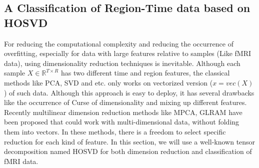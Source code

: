 \documentclass[journal]{IEEEtran}
\begin{document}
	\subsection{ A Classification of Region-Time data  based on  HOSVD}
	For reducing the computational complexity and reducing the occurrence of overfitting, especially for data with large features relative to samples (Like fMRI data), using dimensionality reduction techniques is inevitable. Although each sample $X\in \mathbb{R}^{T\times R}$ has two different time and region features, the classical methods like PCA, SVD and etc. only works on vectorized version ($x=vec(X)$) of such data.
	Although this approach is easy to deploy, it has several drawbacks like the occurrence of Curse of dimensionality and mixing up different features.
	Recently multilinear dimension reduction methods like MPCA, GLRAM \cite{r60,GLRAM}  have been proposed that
	could work with multi-dimensional data, without folding them into vectors.
	In these methods, there is a freedom to select specific reduction for each kind of feature. In this section, we will use a well-known tensor decomposition named HOSVD for both dimension reduction and classification of fMRI data.
	
\end{document}
